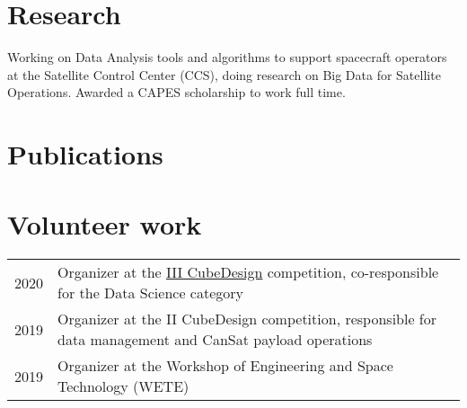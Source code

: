 \documentclass[]{deedy-resume-openfont}
\begin{document}
\begin{minipage}[t]{0.66\textwidth}

\section{Research}
Working on Data Analysis tools and algorithms to support spacecraft operators at the Satellite Control Center (CCS), doing research on Big Data for Satellite Operations.
Awarded a CAPES scholarship to work full time.
\sectionsep


\section{Publications}
\vspace{15pt}
\renewcommand\refname{\vskip -1.5cm} %


\nocite{*}


\section{Volunteer work}
\begin{tabular}{cp{10cm}}
2020 & Organizer at the \href{http://www.inpe.br/cubedesign/2020/}{III CubeDesign} competition, co-responsible for the Data Science category\\
2019 & Organizer at the II CubeDesign competition, responsible for data management and CanSat payload operations\\
2019 & Organizer at the Workshop of Engineering and Space Technology (WETE) \\
\end{tabular}

\end{minipage}
\end{document}
